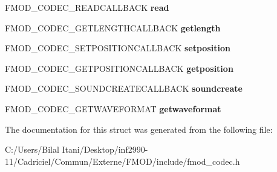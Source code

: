 \begin{DoxyCompactItemize}
\item 
F\+M\+O\+D\+\_\+\+C\+O\+D\+E\+C\+\_\+\+R\+E\+A\+D\+C\+A\+L\+L\+B\+A\+CK {\bfseries read}\hypertarget{struct_f_m_o_d___c_o_d_e_c___d_e_s_c_r_i_p_t_i_o_n_ac64375412d9cd6e73fdf0d9aea0ca37a}{}\label{struct_f_m_o_d___c_o_d_e_c___d_e_s_c_r_i_p_t_i_o_n_ac64375412d9cd6e73fdf0d9aea0ca37a}

\item 
F\+M\+O\+D\+\_\+\+C\+O\+D\+E\+C\+\_\+\+G\+E\+T\+L\+E\+N\+G\+T\+H\+C\+A\+L\+L\+B\+A\+CK {\bfseries getlength}\hypertarget{struct_f_m_o_d___c_o_d_e_c___d_e_s_c_r_i_p_t_i_o_n_a83a086b8d6537aa0c7c271fc2adb4fbf}{}\label{struct_f_m_o_d___c_o_d_e_c___d_e_s_c_r_i_p_t_i_o_n_a83a086b8d6537aa0c7c271fc2adb4fbf}

\item 
F\+M\+O\+D\+\_\+\+C\+O\+D\+E\+C\+\_\+\+S\+E\+T\+P\+O\+S\+I\+T\+I\+O\+N\+C\+A\+L\+L\+B\+A\+CK {\bfseries setposition}\hypertarget{struct_f_m_o_d___c_o_d_e_c___d_e_s_c_r_i_p_t_i_o_n_a7d60d107fe48efef977f2a883fd097be}{}\label{struct_f_m_o_d___c_o_d_e_c___d_e_s_c_r_i_p_t_i_o_n_a7d60d107fe48efef977f2a883fd097be}

\item 
F\+M\+O\+D\+\_\+\+C\+O\+D\+E\+C\+\_\+\+G\+E\+T\+P\+O\+S\+I\+T\+I\+O\+N\+C\+A\+L\+L\+B\+A\+CK {\bfseries getposition}\hypertarget{struct_f_m_o_d___c_o_d_e_c___d_e_s_c_r_i_p_t_i_o_n_a3e532db698aa1f571ddb4afb20f53682}{}\label{struct_f_m_o_d___c_o_d_e_c___d_e_s_c_r_i_p_t_i_o_n_a3e532db698aa1f571ddb4afb20f53682}

\item 
F\+M\+O\+D\+\_\+\+C\+O\+D\+E\+C\+\_\+\+S\+O\+U\+N\+D\+C\+R\+E\+A\+T\+E\+C\+A\+L\+L\+B\+A\+CK {\bfseries soundcreate}\hypertarget{struct_f_m_o_d___c_o_d_e_c___d_e_s_c_r_i_p_t_i_o_n_a9004a5424a76ae31edc173015a20233e}{}\label{struct_f_m_o_d___c_o_d_e_c___d_e_s_c_r_i_p_t_i_o_n_a9004a5424a76ae31edc173015a20233e}

\item 
F\+M\+O\+D\+\_\+\+C\+O\+D\+E\+C\+\_\+\+G\+E\+T\+W\+A\+V\+E\+F\+O\+R\+M\+AT {\bfseries getwaveformat}\hypertarget{struct_f_m_o_d___c_o_d_e_c___d_e_s_c_r_i_p_t_i_o_n_a81c4079df89138532f9c435ebd0d1f64}{}\label{struct_f_m_o_d___c_o_d_e_c___d_e_s_c_r_i_p_t_i_o_n_a81c4079df89138532f9c435ebd0d1f64}

\end{DoxyCompactItemize}


The documentation for this struct was generated from the following file\+:\begin{DoxyCompactItemize}
\item 
C\+:/\+Users/\+Bilal Itani/\+Desktop/inf2990-\/11/\+Cadriciel/\+Commun/\+Externe/\+F\+M\+O\+D/include/fmod\+\_\+codec.\+h\end{DoxyCompactItemize}
